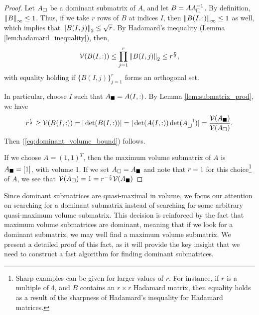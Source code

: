 \documentclass{article}
\begin{document}
	\begin{proof}
		Let $A_\square$ be a dominant submatrix of $A$, and let $B = AA_\square^{-1}$. By definition, $\left\lVert B \right\rVert_\infty \le 1$. Thus, if we take $r$ rows of $B$ at indices $I$, then $\left\lVert B(I,:) \right\rVert_\infty\le 1$ as well, which implies that $\left\lVert B(I,j) \right\rVert_2 \le \sqrt{r}$. By Hadamard's inequality (Lemma \ref{lem:hadamard_inequality}), then,
		\begin{equation}
			\mathcal{V}(B(I,:)) \le \prod_{j=1}^r \left\lVert B(I,j) \right\rVert_2 \le r^\frac{r}{2},
		\end{equation}
		with equality holding if $\{B(I,j)\}_{j=1}^r$ forms an orthogonal set.
		
		In particular, choose $I$ such that $A_\blacksquare = A(I,:)$. By Lemma \ref{lem:submatrix_prod}, we have 
		\begin{equation}
			r^{\frac{r}{2}} \ge \mathcal{V}(B(I,:)) = |\det(B(I,:))| = |\det(A(I,:))\det(A_\square^{-1})| = \frac{\mathcal{V}(A_\blacksquare)}{\mathcal{V}(A_\square)}.
		\end{equation}
		Then (\ref{eq:dominant_volume_bound}) follows.
		
		If we choose $A = (1, 1)^T$, then the maximum volume submatrix of $A$ is $A_\blacksquare = [1]$, with volume 1. If we set $A_\square = A_\blacksquare$ and note that $r=1$ for this choice\footnote{Sharp examples can be given for larger values of $r$. For instance, if $r$ is a multiple of 4, and $B$ contains an $r\times r$ Hadamard matrix, then equality holds as a result of the sharpness of Hadamard's inequality for Hadamard matrices.} of $A$, we see that $\mathcal{V}(A_\square) = 1 = r^{-\frac{r}{2}}\mathcal{V}(A_\blacksquare)$
	\end{proof}
	
	Since dominant submatrices are quasi-maximal in volume, we focus our attention on searching for a dominant submatrix instead of searching for some arbitrary quasi-maximum volume submatrix. This decision is reinforced by the fact that maximum volume submatrices are dominant, meaning that if we look for a dominant submatrix, we may well find a maximum volume submatrix. We present a detailed proof of this fact, as it will provide the key insight that we need to construct a fast algorithm for finding dominant submatrices.
	
\end{document}

